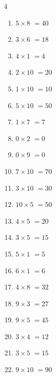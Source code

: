 \begin{multicols}{4}
\begin{enumerate}
  \item $5\times 8$
        $=40$

\columnbreak %

\resetques

  \item $3\times 6$
        $=18$

  \item $4\times 1$
        $=4$

  \item $2\times 10$
        $=20$

  \item $1\times 10$
        $=10$

  \item $5\times 10$
        $=50$

  \item $1\times 7$
        $=7$

  \item $0\times 2$
        $=0$

  \item $0\times 9$
        $=0$

  \item $7\times 10$
        $=70$

  \item $3\times 10$
        $=30$

  \item $10\times 5$
        $=50$

  \item $4\times 5$
        $=20$

  \item $3\times 5$
        $=15$

  \item $5\times 1$
        $=5$

  \item $6\times 1$
        $=6$

  \item $4\times 8$
        $=32$

  \item $9\times 3$
        $=27$

  \item $9\times 5$
        $=45$

  \item $3\times 4$
        $=12$

  \item $3\times 5$
        $=15$

  \item $9\times 10$
        $=90$


\end{enumerate}
\end{multicols}
